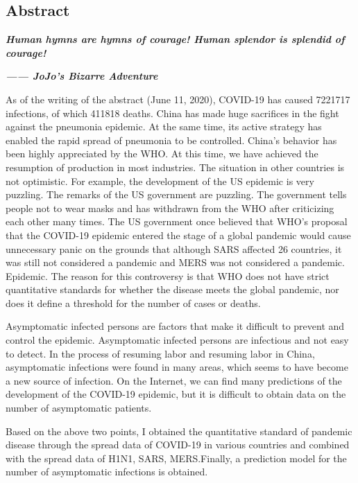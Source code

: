 \documentclass[a4paper, 11pt,twoside=true]{scrartcl}
\begin{document}
\subsection*{Abstract}
\textrm{\textbf{\textit{Human hymns are hymns of courage! Human splendor is splendid of courage!}}}
\begin{flushright}\textrm{\textbf{\textit{—— JoJo's Bizarre Adventure}}}\end{flushright}
\qquad As of the writing of the abstract (June 11, 2020), COVID-19 has caused 7221717 infections, of which 411818 deaths. China has made huge sacrifices in the fight against the pneumonia epidemic. At the same time, its active strategy has enabled the rapid spread of pneumonia to be controlled. China’s behavior has been highly appreciated by the WHO. At this time, we have achieved the resumption of production in most industries. The situation in other countries is not optimistic. For example, the development of the US epidemic is very puzzling. The remarks of the US government are puzzling. The government tells people not to wear masks and has withdrawn from the WHO after criticizing each other many times. The US government once believed that WHO’s proposal that the COVID-19 epidemic entered the stage of a global pandemic would cause unnecessary panic on the grounds that although SARS affected 26 countries, it was still not considered a pandemic and MERS was not considered a pandemic. Epidemic. The reason for this controversy is that WHO does not have strict quantitative standards for whether the disease meets the global pandemic, nor does it define a threshold for the number of cases or deaths.

\quad Asymptomatic infected persons are factors that make it difficult to prevent and control the epidemic. Asymptomatic infected persons are infectious and not easy to detect. In the process of resuming labor and resuming labor in China, asymptomatic infections were found in many areas, which seems to have become a new source of infection. On the Internet, we can find many predictions of the development of the COVID-19 epidemic, but it is difficult to obtain data on the number of asymptomatic patients.

\quad Based on the above two points, I obtained the quantitative standard of pandemic disease through the spread data of COVID-19 in various countries and combined with the spread data of H1N1, SARS, MERS.Finally, a prediction model for the number of asymptomatic infections is obtained.
\end{document}
